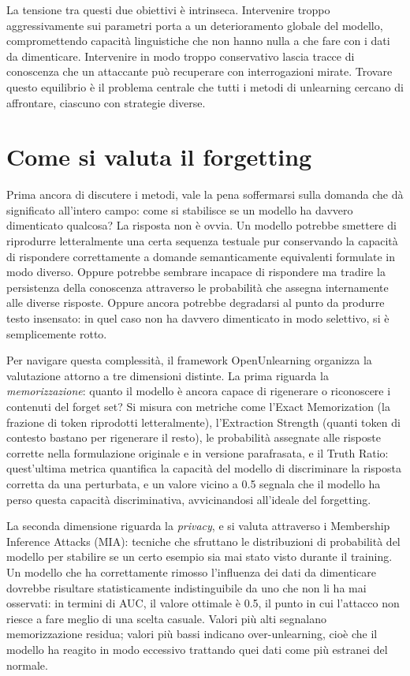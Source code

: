 \documentclass[12pt,a4paper]{article}
\begin{document}
La tensione tra questi due obiettivi è intrinseca. Intervenire troppo aggressivamente sui parametri porta a un deterioramento globale del modello, compromettendo capacità linguistiche che non hanno nulla a che fare con i dati da dimenticare. Intervenire in modo troppo conservativo lascia tracce di conoscenza che un attaccante può recuperare con interrogazioni mirate. Trovare questo equilibrio è il problema centrale che tutti i metodi di unlearning cercano di affrontare, ciascuno con strategie diverse.

\section{Come si valuta il forgetting}

Prima ancora di discutere i metodi, vale la pena soffermarsi sulla domanda che dà significato all'intero campo: come si stabilisce se un modello ha davvero dimenticato qualcosa? La risposta non è ovvia. Un modello potrebbe smettere di riprodurre letteralmente una certa sequenza testuale pur conservando la capacità di rispondere correttamente a domande semanticamente equivalenti formulate in modo diverso. Oppure potrebbe sembrare incapace di rispondere ma tradire la persistenza della conoscenza attraverso le probabilità che assegna internamente alle diverse risposte. Oppure ancora potrebbe degradarsi al punto da produrre testo insensato: in quel caso non ha davvero dimenticato in modo selettivo, si è semplicemente rotto.

Per navigare questa complessità, il framework OpenUnlearning organizza la valutazione attorno a tre dimensioni distinte. La prima riguarda la \emph{memorizzazione}: quanto il modello è ancora capace di rigenerare o riconoscere i contenuti del forget set? Si misura con metriche come l'Exact Memorization (la frazione di token riprodotti letteralmente), l'Extraction Strength (quanti token di contesto bastano per rigenerare il resto), le probabilità assegnate alle risposte corrette nella formulazione originale e in versione parafrasata, e il Truth Ratio: quest'ultima metrica quantifica la capacità del modello di discriminare la risposta corretta da una perturbata, e un valore vicino a 0.5 segnala che il modello ha perso questa capacità discriminativa, avvicinandosi all'ideale del forgetting.

La seconda dimensione riguarda la \emph{privacy}, e si valuta attraverso i Membership Inference Attacks (MIA): tecniche che sfruttano le distribuzioni di probabilità del modello per stabilire se un certo esempio sia mai stato visto durante il training. Un modello che ha correttamente rimosso l'influenza dei dati da dimenticare dovrebbe risultare statisticamente indistinguibile da uno che non li ha mai osservati: in termini di AUC, il valore ottimale è 0.5, il punto in cui l'attacco non riesce a fare meglio di una scelta casuale. Valori più alti segnalano memorizzazione residua; valori più bassi indicano over-unlearning, cioè che il modello ha reagito in modo eccessivo trattando quei dati come più estranei del normale.
\end{document}
